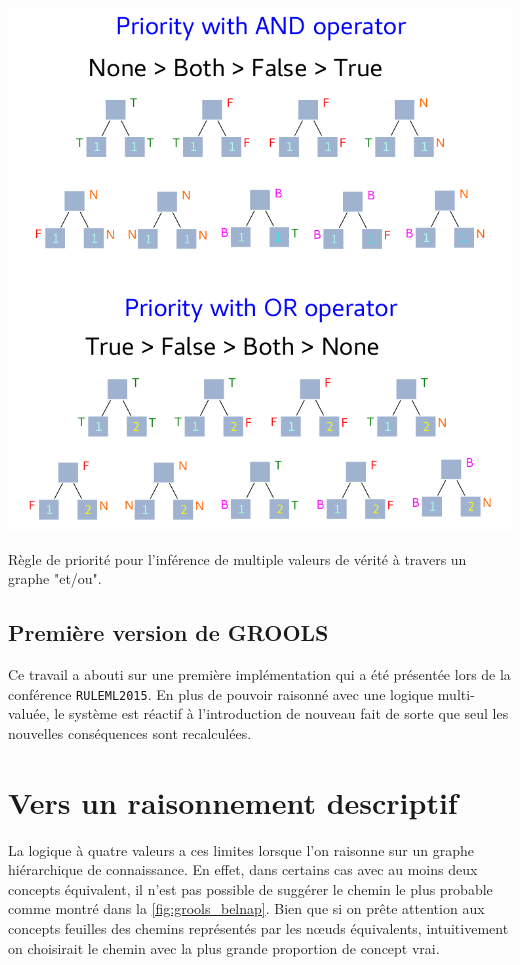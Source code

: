 \begin{refsegment}
\begin{shadedfigure}[H]
    \centering
    \includegraphics[width=\textwidth]{img/four_values_priorities_rules.pdf}
    \caption{ Règle de priorité pour l'inférence de multiple valeurs de vérité à travers un graphe "et/ou". }
    \label{fig:four_truth_values}
\end{shadedfigure}


\subsection{Première version de GROOLS}
Ce travail a abouti sur une première implémentation qui a été présentée lors de la conférence \texttt{RULEML2015}. En plus de pouvoir raisonné avec une logique multi-valuée, le système est réactif à l'introduction de nouveau fait de sorte que seul les nouvelles conséquences sont recalculées.



\section{Vers un raisonnement descriptif}

La logique à quatre valeurs a ces limites lorsque l'on raisonne sur un graphe hiérarchique de connaissance. En effet, dans certains cas avec au moins deux concepts équivalent, il n'est pas possible de suggérer le chemin le plus probable comme montré dans la \cref{fig:grools_belnap}. Bien que si on prête attention aux concepts feuilles des chemins représentés par les nœuds équivalents, intuitivement on choisirait le chemin avec la plus grande proportion de concept vrai.


\end{refsegment}
